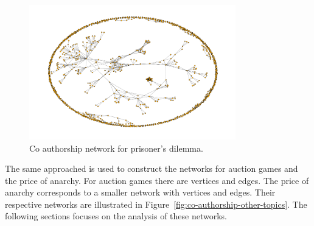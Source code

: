 \documentclass{article}
\newcommand{\auctionauthors}{}
\newcommand{\auctionedges}{}
\newcommand{\priceauthors}{}
\newcommand{\priceedges}{}
\begin{document}
\begin{figure}[!hbtp]
    \centering
    \includegraphics[width=0.8\textwidth]{./assets/images/co-authors-network.pdf}
    \caption{Co authorship network for prisoner's dilemma.}\label{fig:authors_network}
\end{figure}

The same approached is used to construct the networks for auction games and the
price of anarchy. For auction games there are \auctionauthors vertices and \auctionedges
edges. The price of anarchy corresponds to a smaller network with \priceauthors
vertices and \priceedges edges. Their respective networks are illustrated in
Figure~\ref{fig:co-authorship-other-topics}. The following sections focuses on
the analysis of these networks.
\end{document}
